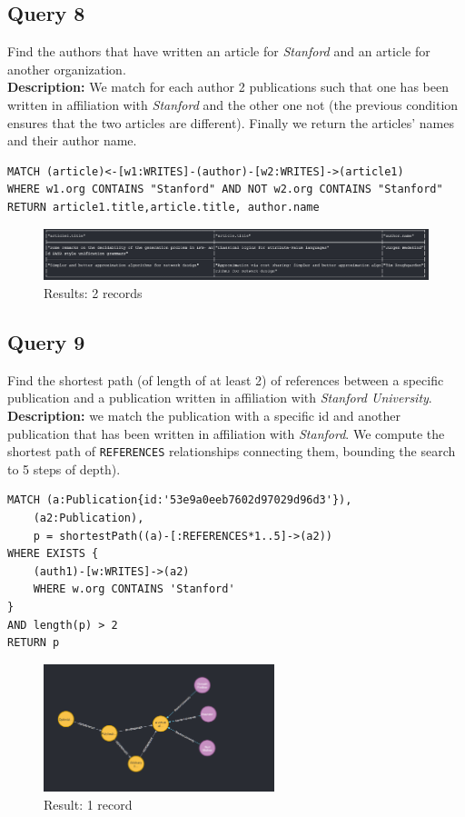\documentclass{Configuration_Files/PoliMi3i_thesis}
\begin{document}
\subsection{Query 8}
Find the authors that have written an article for \emph{Stanford} and an article for another organization.\\
\textbf{Description:} We match for each author 2 publications such that one has been written in affiliation with \emph{Stanford}
and the other one not (the previous condition ensures that the two articles are different). Finally we return the articles'
names and their author name.
\begin{lstlisting}[language=cypher, label=lst:cypher-example]
MATCH (article)<-[w1:WRITES]-(author)-[w2:WRITES]->(article1)
WHERE w1.org CONTAINS "Stanford" AND NOT w2.org CONTAINS "Stanford"
RETURN article1.title,article.title, author.name
\end{lstlisting}
\begin{figure}[H]
\centering
\includegraphics[width=1\textwidth]{query/query8.PNG}
\caption{Results: 2 records}
\label{fig:query8}
\end{figure}

\subsection{Query 9}
Find the shortest path (of length of at least 2) of references between a specific publication and a publication written in
affiliation with \emph{Stanford University}.\\
\textbf{Description:} we match the publication with a specific id and another publication that has been written in
affiliation with \emph{Stanford}. We compute the shortest path of \verb |REFERENCES| relationships connecting them, bounding
the search to 5 steps of depth).
\begin{lstlisting}[language=cypher, label=lst:cypher-example]
MATCH (a:Publication{id:'53e9a0eeb7602d97029d96d3'}),
    (a2:Publication),
    p = shortestPath((a)-[:REFERENCES*1..5]->(a2))
WHERE EXISTS {
    (auth1)-[w:WRITES]->(a2)
    WHERE w.org CONTAINS 'Stanford'
}
AND length(p) > 2
RETURN p
\end{lstlisting}
\begin{figure}[H]
\centering
\includegraphics[width=0.6\textwidth]{query/query9.PNG}
\caption{Result: 1 record}
\label{fig:query9}
\end{figure}
\end{document}
